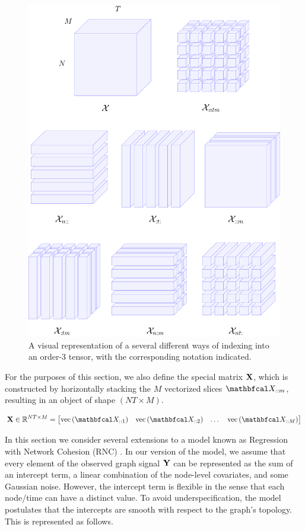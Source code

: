 \begin{figure}[t] 
    \centering
    \includegraphics[width=0.6\linewidth]{Figures/X_tensor.pdf}
    \caption[Tensor indexing notation]{A visual representation of a several different ways of indexing into an order-3 tensor, with the corresponding notation indicated.}
    \label{fig:X_tensor_indexing}
\end{figure}


For the purposes of this section, we also define the special matrix $\mathbf{X}$, which is constructed by horizontally stacking the $M$ vectorized slices $\Xt_{::m}$, resulting in an object of shape $(NT \times M)$. 

\begin{equation}
    \label{eq:X_RNC}
    \X \in \R^{NT \times M} = \begin{bmatrix} \vecc{\Xt_{::1}} & \vecc{\Xt_{::2}} & \dots & \vecc{\Xt_{::M}} \end{bmatrix}    
\end{equation}

In this section we consider several extensions to a model known as Regression with Network Cohesion (RNC) \citep{Li2019}. In our version of the model, we assume that every element of the observed graph signal $\mathbf{Y}$ can be represented as the sum of an intercept term, a linear combination of the node-level covariates, and some Gaussian noise. However, the intercept term is flexible in the sense that each node/time can have a distinct value. To avoid underspecification, the model postulates that the intercepts are smooth with respect to the graph's topology. This is represented as follows. 

